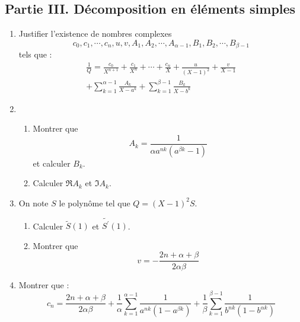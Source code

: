 \subsection*{Partie III. Décomposition en éléments simples}
\begin{enumerate}
 \item Justifier l'existence de nombres complexes
\begin{displaymath}
 c_0, c_1, \cdots , c_n, u, v, A_1, A_2, \cdots , A_{\alpha -1}, B_1, B_2, \cdots , B_{\beta -1}
\end{displaymath}
tels que :
\begin{multline*}
 \frac{1}{Q} = \frac{c_0}{X^{n+1}} +\frac{c_1}{X^{n}} + \cdots + \frac{c_{n}}{X} 
  + \frac{u}{(X-1)^2} + \frac{v}{X-1}\\
+ \sum_{k=1}^{\alpha -1}\frac{A_k}{X-a^k} + \sum_{k=1}^{\beta -1}\frac{B_k}{X-b^k} 
\end{multline*}
\item \begin{enumerate}
 \item Montrer que 
\begin{displaymath}
 A_k = \frac{1}{\alpha a^{n k}(a^{\beta k}-1)}
\end{displaymath}
et calculer $B_k$.
\item Calculer $\Re A_k$ et $\Im A_k$.
\end{enumerate}
\item On note $S$ le polynôme tel que $Q=(X-1)^2 S$.
\begin{enumerate}
 \item Calculer $\widetilde{S}(1)$ et $\widetilde{S^\prime}(1)$.
\item  Montrer que 
\begin{displaymath}
 v = -\frac{2n+\alpha + \beta}{2\alpha \beta}
\end{displaymath}
\end{enumerate}
\item Montrer que :
\begin{displaymath}
 c_n= \frac{2n+\alpha + \beta}{2\alpha \beta} + \frac{1}{\alpha}\sum_{k=1}^{\alpha -1}\frac{1}{a^{n k}(1-a^{\beta k})} 
 + \frac{1}{\beta}\sum_{k=1}^{\beta -1}\frac{1}{b^{n k}(1-b^{\alpha k})}
\end{displaymath}
\end{enumerate}

